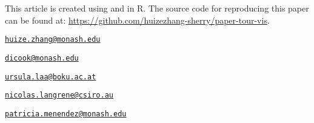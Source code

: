 This article is created using \citep{knitr} and
 \citep{rmarkdown} in R. The source code for
reproducing this paper can be found at:
\url{https://github.com/huizezhang-sherry/paper-tour-vis}.




\address{%
H.Sherry Zhang\\
Monash University\\
Department of Econometrics and Business Statistics\\
}
\href{mailto:huize.zhang@monash.edu}{\nolinkurl{huize.zhang@monash.edu}}

\address{%
Dianne Cook\\
Monash University\\
Department of Econometrics and Business Statistics\\
}
\href{mailto:dicook@monash.edu}{\nolinkurl{dicook@monash.edu}}

\address{%
Ursula Laa\\
University of Natural Resources and Life Sciences\\
Institute of Statistics\\
}
\href{mailto:ursula.laa@boku.ac.at}{\nolinkurl{ursula.laa@boku.ac.at}}

\address{%
Nicolas Langrené\\
CSIRO Data61\\
34 Village Street, Docklands VIC 3008 Australia\\
}
\href{mailto:nicolas.langrene@csiro.au}{\nolinkurl{nicolas.langrene@csiro.au}}

\address{%
Patricia Menéndez\\
Monash University\\
Department of Econometrics and Business Statistics\\
}
\href{mailto:patricia.menendez@monash.edu}{\nolinkurl{patricia.menendez@monash.edu}}

